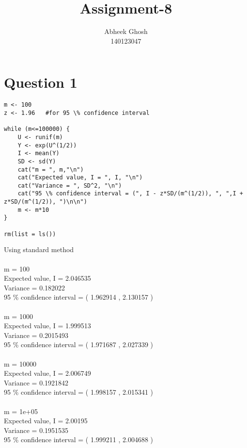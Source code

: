\documentclass{article}
\begin{document}
	\title{\textbf{Assignment-8}}
	\author{Abheek Ghosh \\ 
		140123047 }
	
	\maketitle
	

\section{Question 1}


\begin{lstlisting}
m <- 100
z <- 1.96	#for 95 \% confidence interval

while (m<=100000) {
	U <- runif(m)
	Y <- exp(U^(1/2))
	I <- mean(Y)
	SD <- sd(Y)
	cat("m = ", m,"\n")
	cat("Expected value, I = ", I, "\n")
	cat("Variance = ", SD^2, "\n")
	cat("95 \% confidence interval = (", I - z*SD/(m^(1/2)), ", ",I + z*SD/(m^(1/2)), ")\n\n")
	m <- m*10
}

rm(list = ls())
\end{lstlisting}
Using standard method\\\\
m =  100 \\
Expected value, I =  2.046535 \\
Variance =  0.182022 \\
95 \% confidence interval = ( 1.962914 ,  2.130157 )\\\\
m =  1000 \\
Expected value, I =  1.999513 \\
Variance =  0.2015493 \\
95 \% confidence interval = ( 1.971687 ,  2.027339 )\\\\
m =  10000 \\
Expected value, I =  2.006749 \\
Variance =  0.1921842 \\
95 \% confidence interval = ( 1.998157 ,  2.015341 )\\\\
m =  1e+05 \\
Expected value, I =  2.00195 \\
Variance =  0.1951535 \\
95 \% confidence interval = ( 1.999211 ,  2.004688 )\\
\pagebreak
\end{document}
